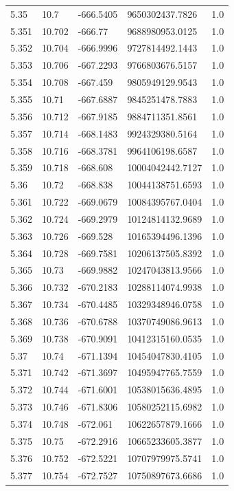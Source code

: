 \begin{tabular}{lllll}
5.35 & 10.7 & -666.5405 & 9650302437.7826 & 1.0 \\
5.351 & 10.702 & -666.77 & 9688980953.0125 & 1.0 \\
5.352 & 10.704 & -666.9996 & 9727814492.1443 & 1.0 \\
5.353 & 10.706 & -667.2293 & 9766803676.5157 & 1.0 \\
5.354 & 10.708 & -667.459 & 9805949129.9543 & 1.0 \\
5.355 & 10.71 & -667.6887 & 9845251478.7883 & 1.0 \\
5.356 & 10.712 & -667.9185 & 9884711351.8561 & 1.0 \\
5.357 & 10.714 & -668.1483 & 9924329380.5164 & 1.0 \\
5.358 & 10.716 & -668.3781 & 9964106198.6587 & 1.0 \\
5.359 & 10.718 & -668.608 & 10004042442.7127 & 1.0 \\
5.36 & 10.72 & -668.838 & 10044138751.6593 & 1.0 \\
5.361 & 10.722 & -669.0679 & 10084395767.0404 & 1.0 \\
5.362 & 10.724 & -669.2979 & 10124814132.9689 & 1.0 \\
5.363 & 10.726 & -669.528 & 10165394496.1396 & 1.0 \\
5.364 & 10.728 & -669.7581 & 10206137505.8392 & 1.0 \\
5.365 & 10.73 & -669.9882 & 10247043813.9566 & 1.0 \\
5.366 & 10.732 & -670.2183 & 10288114074.9938 & 1.0 \\
5.367 & 10.734 & -670.4485 & 10329348946.0758 & 1.0 \\
5.368 & 10.736 & -670.6788 & 10370749086.9613 & 1.0 \\
5.369 & 10.738 & -670.9091 & 10412315160.0535 & 1.0 \\
5.37 & 10.74 & -671.1394 & 10454047830.4105 & 1.0 \\
5.371 & 10.742 & -671.3697 & 10495947765.7559 & 1.0 \\
5.372 & 10.744 & -671.6001 & 10538015636.4895 & 1.0 \\
5.373 & 10.746 & -671.8306 & 10580252115.6982 & 1.0 \\
5.374 & 10.748 & -672.061 & 10622657879.1666 & 1.0 \\
5.375 & 10.75 & -672.2916 & 10665233605.3877 & 1.0 \\
5.376 & 10.752 & -672.5221 & 10707979975.5741 & 1.0 \\
5.377 & 10.754 & -672.7527 & 10750897673.6686 & 1.0 \\

\end{tabular}
